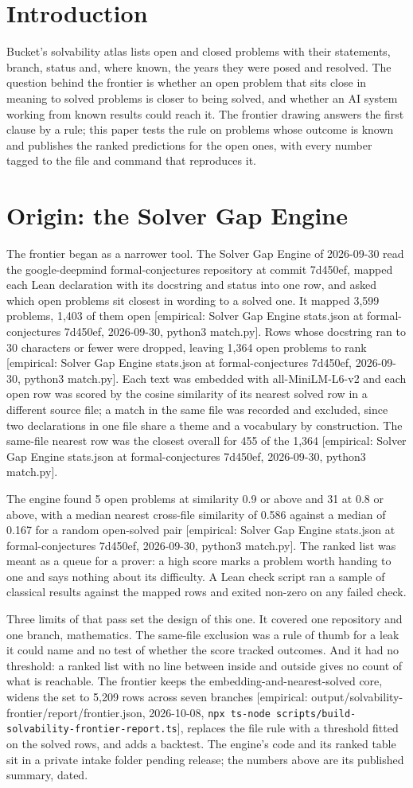 \documentclass[11pt]{article}
\newcommand{\emp}[1]{\textcolor{bucketgray}{\footnotesize [empirical: #1]}}
\newcommand{\cmd}{\texttt{npx ts-node scripts/build-solvability-frontier-report.ts}}
\newcommand{\fr}{\emp{output/solvability-frontier/report/frontier.json, 2026-10-08, \cmd}}
\newcommand{\sg}{\emp{Solver Gap Engine stats.json at formal-conjectures 7d450ef, 2026-09-30, python3 match.py}}
\begin{document}
\section{Introduction}
\label{sec:intro}

Bucket's solvability atlas lists open and closed problems with their statements, branch, status and, where known, the years they were posed and resolved. The question behind the frontier is whether an open problem that sits close in meaning to solved problems is closer to being solved, and whether an AI system working from known results could reach it. The frontier drawing answers the first clause by a rule; this paper tests the rule on problems whose outcome is known and publishes the ranked predictions for the open ones, with every number tagged to the file and command that reproduces it.

\section{Origin: the Solver Gap Engine}
\label{sec:origin}

The frontier began as a narrower tool. The Solver Gap Engine of 2026-09-30 read the google-deepmind formal-conjectures repository at commit 7d450ef, mapped each Lean declaration with its docstring and status into one row, and asked which open problems sit closest in wording to a solved one. It mapped 3,599 problems, 1,403 of them open \sg. Rows whose docstring ran to 30 characters or fewer were dropped, leaving 1,364 open problems to rank \sg. Each text was embedded with all-MiniLM-L6-v2 and each open row was scored by the cosine similarity of its nearest solved row in a different source file; a match in the same file was recorded and excluded, since two declarations in one file share a theme and a vocabulary by construction. The same-file nearest row was the closest overall for 455 of the 1,364 \sg.

The engine found 5 open problems at similarity 0.9 or above and 31 at 0.8 or above, with a median nearest cross-file similarity of 0.586 against a median of 0.167 for a random open-solved pair \sg. The ranked list was meant as a queue for a prover: a high score marks a problem worth handing to one and says nothing about its difficulty. A Lean check script ran a sample of classical results against the mapped rows and exited non-zero on any failed check.

Three limits of that pass set the design of this one. It covered one repository and one branch, mathematics. The same-file exclusion was a rule of thumb for a leak it could name and no test of whether the score tracked outcomes. And it had no threshold: a ranked list with no line between inside and outside gives no count of what is reachable. The frontier keeps the embedding-and-nearest-solved core, widens the set to 5,209 rows across seven branches \fr, replaces the file rule with a threshold fitted on the solved rows, and adds a backtest. The engine's code and its ranked table sit in a private intake folder pending release; the numbers above are its published summary, dated.
\end{document}
